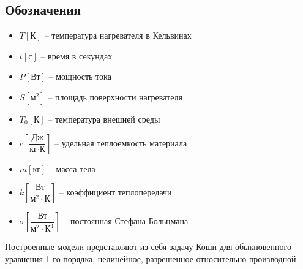 		\subsection*{Обозначения}
			\begin{itemize}
				\item \( T \left[\text{К} \right] \) -- температура нагревателя в Кельвинах
				\item \(t \left[\text{с} \right] \) -- время в секундах
				\item \( P \left[\text{Вт} \right] \) -- мощность тока
				\item \( S \left[\text{м}^2 \right] \) -- площадь поверхности нагревателя
				\item \( T_0 \left[\text{К} \right] \) -- температура внешней среды
				\item \( c \left[\dfrac{\text{Дж}}{\text{кг} \cdot \text{К}} \right] \) -- удельная теплоемкость материала
				\item \( m \left[\text{кг} \right] \) -- масса тела
				\item \( k \left[\dfrac{\text{Вт}}{\text{м}^2 \cdot \text{К}} \right]\) -- коэффициент теплопередачи
				\item \( \sigma \left[\dfrac{\text{Вт}}{\text{м}^2 \cdot \text{К}^4} \right] \) -- постоянная Стефана-Больцмана
			\end{itemize}

		Построенные модели представляют из себя задачу Коши для обыкновенного уравнения 1-го порядка, нелинейное, разрешенное относительно производной.


\pagebreak